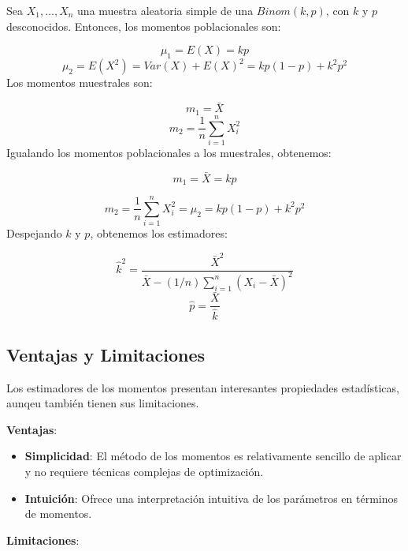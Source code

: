 \documentclass[
  letterpaper,
  DIV=11,
  numbers=noendperiod]{scrreprt}
\providecommand{\tightlist}{%
  \setlength{\itemsep}{0pt}\setlength{\parskip}{0pt}}\usepackage{longtable,booktabs,array}
\begin{document}
\begin{tcolorbox}[enhanced jigsaw, arc=.35mm, breakable, coltitle=black, left=2mm, opacityback=0, bottomtitle=1mm, colbacktitle=quarto-callout-tip-color!10!white, title=\textcolor{quarto-callout-tip-color}{\faLightbulb}\hspace{0.5em}{Ejemplo, distribución Binomial}, titlerule=0mm, colback=white, colframe=quarto-callout-tip-color-frame, bottomrule=.15mm, rightrule=.15mm, opacitybacktitle=0.6, toptitle=1mm, toprule=.15mm, leftrule=.75mm]

Sea \(X_1,\ldots,X_n\) una muestra aleatoria simple de una
\(Binom(k,p)\), con \(k\) y \(p\) desconocidos. Entonces, los momentos
poblacionales son:

\[\mu_1=E(X)=kp\] \[\mu_2=E(X^2)=Var(X)+E(X)^2=kp(1-p)+k^2p^2\] Los
momentos muestrales son:

\[
m_1=\bar{X}
\] \[
m_2=\frac{1}{n}\sum_{i=1}^nX_i^2
\] Igualando los momentos poblacionales a los muestrales, obtenemos:

\[
m_1=\bar{X}=kp
\]

\[
m_2=\frac{1}{n}\sum_{i=1}^nX_i^2=\mu_2=kp(1-p)+k^2p^2
\] Despejando \(k\) y \(p\), obtenemos los estimadores:

\[
\hat{k}^2=\frac{\bar{X}^2}{\bar{X}-(1/n)\sum_{i=1}^n(X_i- \bar{X})^2}
\] \[\hat{p}=\frac{\bar{X}}{\hat{k}}\]

\end{tcolorbox}

\hypertarget{ventajas-y-limitaciones}{%
\subsection{Ventajas y Limitaciones}\label{ventajas-y-limitaciones}}

Los estimadores de los momentos presentan interesantes propiedades
estadísticas, aunqeu también tienen sus limitaciones.

\textbf{Ventajas}:

\begin{itemize}
\tightlist
\item
  \textbf{Simplicidad}: El método de los momentos es relativamente
  sencillo de aplicar y no requiere técnicas complejas de optimización.
\item
  \textbf{Intuición}: Ofrece una interpretación intuitiva de los
  parámetros en términos de momentos.
\end{itemize}

\textbf{Limitaciones}:
\end{document}
